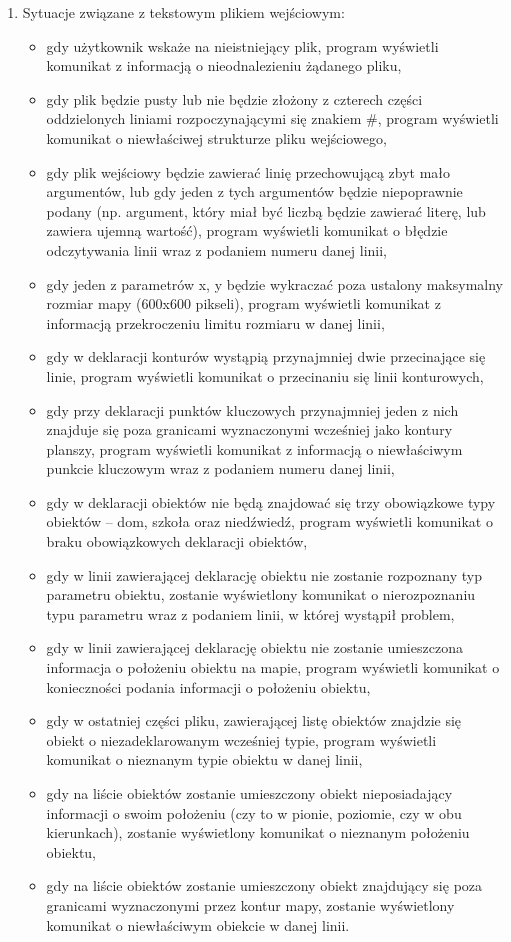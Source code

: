 \documentclass[a4paper,12pt]{article}
\begin{document}
\begin{enumerate}

\item Sytuacje związane z tekstowym plikiem wejściowym:
\begin{itemize}
\item gdy użytkownik wskaże na nieistniejący plik, program wyświetli komunikat z informacją o nieodnalezieniu żądanego pliku,
\item gdy plik będzie pusty lub nie będzie złożony z czterech części oddzielonych liniami rozpoczynającymi się znakiem \#, program wyświetli komunikat o niewłaściwej strukturze pliku wejściowego,
\item gdy plik wejściowy będzie zawierać linię przechowującą zbyt mało argumentów, lub gdy jeden z tych argumentów będzie niepoprawnie podany (np. argument, który miał być liczbą będzie zawierać literę, lub zawiera ujemną wartość), program wyświetli komunikat o błędzie odczytywania linii wraz z podaniem numeru danej linii,
\item gdy jeden z parametrów x, y będzie wykraczać poza ustalony maksymalny rozmiar mapy (600x600 pikseli), program wyświetli komunikat z informacją przekroczeniu limitu rozmiaru w danej linii,
\item gdy w deklaracji konturów wystąpią przynajmniej dwie przecinające się linie, program wyświetli komunikat o przecinaniu się linii konturowych,
\item gdy przy deklaracji punktów kluczowych przynajmniej jeden z nich znajduje się poza granicami wyznaczonymi wcześniej jako kontury planszy, program wyświetli komunikat z informacją o niewłaściwym punkcie kluczowym wraz z podaniem numeru danej linii,
\item gdy w deklaracji obiektów nie będą znajdować się trzy obowiązkowe typy obiektów -- dom, szkoła oraz niedźwiedź, program wyświetli komunikat o braku obowiązkowych deklaracji obiektów,
\item gdy w linii zawierającej deklarację obiektu nie zostanie rozpoznany typ parametru obiektu, zostanie wyświetlony komunikat o nierozpoznaniu typu parametru wraz z podaniem linii, w której wystąpił problem,
\item gdy w linii zawierającej deklarację obiektu nie zostanie umieszczona informacja o położeniu obiektu na mapie, program wyświetli komunikat o konieczności podania informacji o położeniu obiektu,
\item gdy w ostatniej części pliku, zawierającej listę obiektów znajdzie się obiekt o niezadeklarowanym wcześniej typie, program wyświetli komunikat o nieznanym typie obiektu w danej linii,
\item gdy na liście obiektów zostanie umieszczony obiekt nieposiadający informacji o swoim położeniu (czy to w pionie, poziomie, czy w obu kierunkach), zostanie wyświetlony komunikat o nieznanym położeniu obiektu, 
\item gdy na liście obiektów zostanie umieszczony obiekt znajdujący się poza granicami wyznaczonymi przez kontur mapy, zostanie wyświetlony komunikat o niewłaściwym obiekcie w danej linii.


\end{itemize}
\end{enumerate}
\end{document}
